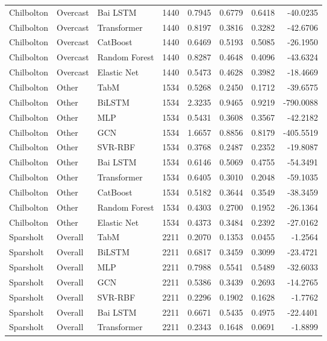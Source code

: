 \begin{longtable}{lllrrrrr}
Chilbolton & Overcast & Bai LSTM & 1440 & 0.7945 & 0.6779 & 0.6418 & -40.0235 \\
Chilbolton & Overcast & Transformer & 1440 & 0.8197 & 0.3816 & 0.3282 & -42.6706 \\
Chilbolton & Overcast & CatBoost & 1440 & 0.6469 & 0.5193 & 0.5085 & -26.1950 \\
Chilbolton & Overcast & Random Forest & 1440 & 0.8287 & 0.4648 & 0.4096 & -43.6324 \\
Chilbolton & Overcast & Elastic Net & 1440 & 0.5473 & 0.4628 & 0.3982 & -18.4669 \\
\midrule
Chilbolton & Other & TabM & 1534 & 0.5268 & 0.2450 & 0.1712 & -39.6575 \\
Chilbolton & Other & BiLSTM & 1534 & 2.3235 & 0.9465 & 0.9219 & -790.0088 \\
Chilbolton & Other & MLP & 1534 & 0.5431 & 0.3608 & 0.3567 & -42.2182 \\
Chilbolton & Other & GCN & 1534 & 1.6657 & 0.8856 & 0.8179 & -405.5519 \\
Chilbolton & Other & SVR-RBF & 1534 & 0.3768 & 0.2487 & 0.2352 & -19.8087 \\
Chilbolton & Other & Bai LSTM & 1534 & 0.6146 & 0.5069 & 0.4755 & -54.3491 \\
Chilbolton & Other & Transformer & 1534 & 0.6405 & 0.3010 & 0.2048 & -59.1035 \\
Chilbolton & Other & CatBoost & 1534 & 0.5182 & 0.3644 & 0.3549 & -38.3459 \\
Chilbolton & Other & Random Forest & 1534 & 0.4303 & 0.2700 & 0.1952 & -26.1364 \\
Chilbolton & Other & Elastic Net & 1534 & 0.4373 & 0.3484 & 0.2392 & -27.0162 \\
\midrule
Sparsholt & Overall & TabM & 2211 & 0.2070 & 0.1353 & 0.0455 & -1.2564 \\
Sparsholt & Overall & BiLSTM & 2211 & 0.6817 & 0.3459 & 0.3099 & -23.4721 \\
Sparsholt & Overall & MLP & 2211 & 0.7988 & 0.5541 & 0.5489 & -32.6033 \\
Sparsholt & Overall & GCN & 2211 & 0.5386 & 0.3439 & 0.2693 & -14.2765 \\
Sparsholt & Overall & SVR-RBF & 2211 & 0.2296 & 0.1902 & 0.1628 & -1.7762 \\
Sparsholt & Overall & Bai LSTM & 2211 & 0.6671 & 0.5435 & 0.4975 & -22.4401 \\
Sparsholt & Overall & Transformer & 2211 & 0.2343 & 0.1648 & 0.0691 & -1.8899 \\

\end{longtable}
